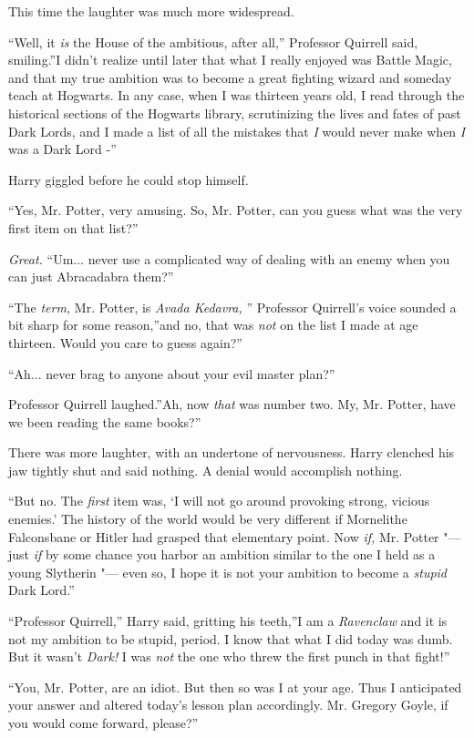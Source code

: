 This time the laughter was much more widespread.

``Well, it \emph{is} the House of the ambitious, after all,'' Professor
Quirrell said, smiling.''I didn't realize until later that what I really
enjoyed was Battle Magic, and that my true ambition was to become a
great fighting wizard and someday teach at Hogwarts. In any case, when I
was thirteen years old, I read through the historical sections of the
Hogwarts library, scrutinizing the lives and fates of past Dark Lords,
and I made a list of all the mistakes that \emph{I} would never make
when \emph{I} was a Dark Lord -''

Harry giggled before he could stop himself.

``Yes, Mr. Potter, very amusing. So, Mr. Potter, can you guess what was
the very first item on that list?''

\emph{Great.} ``Um... never use a complicated way of dealing with
an enemy when you can just Abracadabra them?''

``The \emph{term,} Mr. Potter, is \emph{Avada Kedavra,} '' Professor
Quirrell's voice sounded a bit sharp for some reason,''and no, that was
\emph{not} on the list I made at age thirteen. Would you care to guess
again?''

``Ah... never brag to anyone about your evil master plan?''

Professor Quirrell laughed.''Ah, now \emph{that} was number two. My, Mr.
Potter, have we been reading the same books?''

There was more laughter, with an undertone of nervousness. Harry
clenched his jaw tightly shut and said nothing. A denial would
accomplish nothing.

``But no. The \emph{first} item was, `I will not go around provoking
strong, vicious enemies.' The history of the world would be very
different if Mornelithe Falconsbane or Hitler had grasped that
elementary point. Now \emph{if,} Mr. Potter "--- just \emph{if} by some
chance you harbor an ambition similar to the one I held as a young
Slytherin "--- even so, I hope it is not your ambition to become a
\emph{stupid} Dark Lord.''

``Professor Quirrell,'' Harry said, gritting his teeth,''I am a
\emph{Ravenclaw} and it is not my ambition to be stupid, period. I know
that what I did today was dumb. But it wasn't \emph{Dark!} I was
\emph{not} the one who threw the first punch in that fight!''

``You, Mr. Potter, are an idiot. But then so was I at your age. Thus I
anticipated your answer and altered today's lesson plan accordingly. Mr.
Gregory Goyle, if you would come forward, please?''

